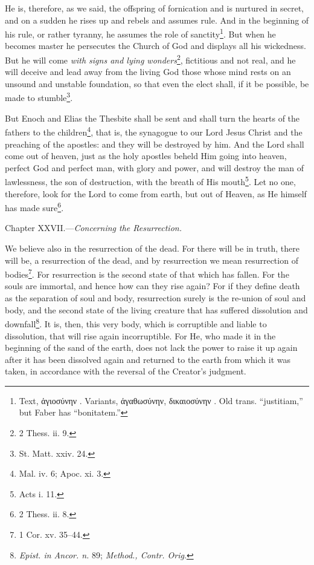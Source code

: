 He is, therefore, as we said, the offspring of fornication and is nurtured in secret, and on a sudden he rises up and rebels and assumes rule. And in the beginning of his rule, or rather tyranny, he assumes the role of sanctity\footnote{Text, \textgreek{ἁγιοσύνην . Variants, ἀγαθωσύνην, δικαιοσύνην .} Old trans. “justitiam,” but Faber has “bonitatem.”}. But when he becomes master he persecutes the Church of God and displays all his wickedness. But he will come \emph{with signs and lying wonders}\footnote{2 Thess. ii. 9.}, fictitious and not real, and he will deceive and lead away from the living God those whose mind rests on an unsound and unstable foundation, so that even the elect shall, if it be possible, be made to stumble\footnote{St. Matt. xxiv. 24.}.

But Enoch and Elias the Thesbite shall be sent and shall turn the hearts of the fathers to the children\footnote{Mal. iv. 6; Apoc. xi. 3.}, that is, the synagogue to our Lord Jesus Christ and the preaching of the apostles: and they will be destroyed by him. And the Lord shall come out of heaven, just as the holy apostles beheld Him going into heaven, perfect God and perfect man, with glory and power, and will destroy the man of lawlessness, the son of destruction, with the breath of His mouth\footnote{Acts i. 11.}. Let no one, therefore, look for the Lord to come from earth, but out of Heaven, as He himself has made sure\footnote{2 Thess. ii. 8.}.


Chapter XXVII.—\emph{Concerning the Resurrection.}

We believe also in the resurrection of the dead. For there will be in truth, there will be, a resurrection of the dead, and by resurrection we mean resurrection of bodies\footnote{1 Cor. xv. 35–44.}. For resurrection is the second state of that which has fallen. For the souls are immortal, and hence how can they rise again? For if they define death as the separation of soul and body, resurrection surely is the re-union of soul and body, and the second state of the living creature that has suffered dissolution and downfall\footnote{\emph{Epist. in Ancor. n. }89; \emph{Method., Contr. Orig}.}. It is, then, this very body, which is corruptible and liable to dissolution, that will rise again incorruptible. For He, who made it in the beginning of the sand of the earth, does not lack the power to raise it up again after it has been dissolved again and returned to the earth from which it was taken, in accordance with the reversal of the Creator’s judgment.


